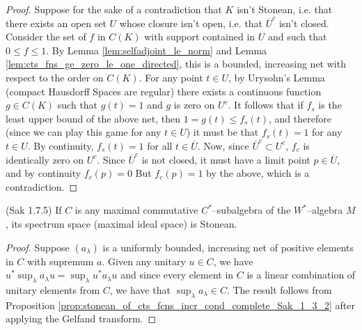 \begin{proof}
    Suppose for the sake of a contradiction that $K$ isn't Stonean, i.e. that there exists an
    open set $U$ whose closure isn't open, i.e. that $\overline{U}^{c}$ isn't closed.
    Consider the set of $f$ in $C(K)$ with support contained in $U$ and such that $0\le f\le 1$.
    By Lemma \ref{lem:selfadjoint_le_norm} and Lemma \ref{lem:cts_fns_ge_zero_le_one_directed},
    this is a bounded, increasing net with respect to the order on $C(K)$.
    For any point $t\in U$, by Urysohn's Lemma (compact Hausdorff Spaces are regular) there
    exists a continuous function $g\in C(K)$ such that $g(t)=1$ and $g$ is zero on $U^{c}$.
    It follows that if $f_s$ is the least upper bound of the above net, then $1=g(t)\le f_s(t)$,
    and therefore (since we can play this game for any $t\in U$) it must be that $f_s(t)=1$ for any $t\in U$.
    By continuity, $f_s(t)=1$ for all $t\in\overline{U}$. Now, since $\overline{U}^{c}\subset U^{c}$,
    $f_c$ is identically zero on $U^{c}$. Since $\overline{U}^{c}$ is not closed, it must have a limit point
    $p\in \overline{U}$, and by continuity $f_c(p)=0$ But $f_c(p)=1$ by the above, which is a contradiction.
\end{proof}

\begin{lemma}
  \label{lem:spec_masa_wstar_stonean_Sak_1_7_5} (Sak 1.7.5)
  If $C$ is any maximal commutative $C^*$--subalgebra of the $W^{*}$--algebra $M$, its
  spectrum space (maximal ideal space) is Stonean.
\end{lemma}

\begin{proof}
  Suppose $(a_{\lambda})$ is a uniformly bounded, increasing net of positive elements in $C$ with supremum $a$.
  Given any unitary $u\in C$, we have $u^{*}\sup_{\lambda}a_{\lambda} u=\sup_{\lambda}u^{*}a_{\lambda}u$ and since every
  element in $C$ is a linear combination of unitary elements from $C$, we have that $\sup_{\lambda}a_{\lambda}\in C$. The result
  follows from Proposition \ref{prop:stonean_of_cts_fcns_incr_cond_complete_Sak_1_3_2} after applying the Gelfand transform.
\end{proof}
